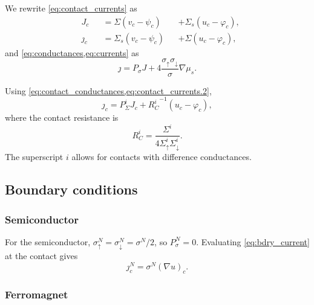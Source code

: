 We rewrite \cref{eq:contact_currents} as
\begin{subequations}
  \label{eq:contact_currents.2}
  \begin{alignat}{3}
    \label{eq:contact_currents.2.current}
    & J_c && = Σ   \left( v_c - ψ_c \right) && + Σ_s \left( u_c - φ_c \right) , \\
    \label{eq:contact_currents.2.spincurrent}
    & ȷ_c && = Σ_s \left( v_c - ψ_c \right) && + Σ   \left( u_c - φ_c \right) ,
  \end{alignat}
\end{subequations}
and \cref{eq:conductances,eq:currents} as
\begin{equation}
  \label{eq:bdry_current}
  ȷ = P_σ J + 4 \frac{σ_↑ σ_↓}{σ} ∇μ_s .
\end{equation}

Using \cref{eq:contact_conductances,eq:contact_currents.2},
\begin{equation}
  \label{eq:bdry_current_contact}
  ȷ_c = P_Σ^i J_c + {R_C^i}^{-1} \left( u_c - φ_c \right) ,
\end{equation}
where the contact resistance is
\begin{equation}
  R_C^i = \frac{Σ^i}{4 Σ_↑^i Σ_↓^i} .
\end{equation}
The superscript $i$ allows for contacts with difference conductances.

\subsection{Boundary conditions}

\subsubsection{Semiconductor}

For the semiconductor, $σ^N_↑ = σ^N_↓ = σ^N / 2$, so $P_σ^N = 0$.
Evaluating \cref{eq:bdry_current} at the contact gives
\begin{equation}
  \label{eq:bdry_current.semiconductor}
  ȷ^N_c = σ^N ( ∇u )_c .
\end{equation}

\subsubsection{Ferromagnet}

